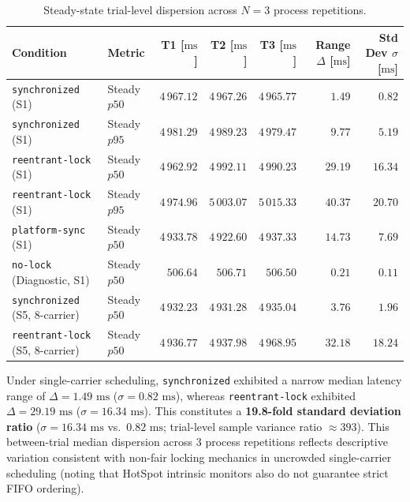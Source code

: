 \begin{table}[htbp]
  \centering
  \small
  \setlength{\tabcolsep}{3.5pt}
  \caption{Steady-state trial-level dispersion across $N=3$ process repetitions.}
  \label{tab:aqs-dispersion}
  \begin{tabularx}{\textwidth}{@{}>{\raggedright\arraybackslash}X l r r r r r@{}}
    \toprule
    \textbf{Condition} & \textbf{Metric} & \shortstack{\textbf{T1}\\\textbf{[$\text{ms}$]}} & \shortstack{\textbf{T2}\\\textbf{[$\text{ms}$]}} & \shortstack{\textbf{T3}\\\textbf{[$\text{ms}$]}} & \shortstack{\textbf{Range}\\\textbf{$\Delta$ [$\text{ms}$]}} & \shortstack{\textbf{Std Dev}\\\textbf{$\sigma$ [$\text{ms}$]}} \\
    \midrule
    \texttt{synchronized} (S1) & Steady $p50$ & $4\,967.12$ & $4\,967.26$ & $4\,965.77$ & $\mathbf{1.49}$ & $\mathbf{0.82}$ \\
    \texttt{synchronized} (S1) & Steady $p95$ & $4\,981.29$ & $4\,989.23$ & $4\,979.47$ & $9.77$ & $5.19$ \\
    \midrule
    \texttt{reentrant-lock} (S1) & Steady $p50$ & $4\,962.92$ & $4\,992.11$ & $4\,990.23$ & $\mathbf{29.19}$ & $\mathbf{16.34}$ \\
    \texttt{reentrant-lock} (S1) & Steady $p95$ & $4\,974.96$ & $5\,003.07$ & $5\,015.33$ & $40.37$ & $20.70$ \\
    \midrule
    \texttt{platform-sync} (S1) & Steady $p50$ & $4\,933.78$ & $4\,922.60$ & $4\,937.33$ & $14.73$ & $7.69$ \\
    \texttt{no-lock} (Diagnostic, S1) & Steady $p50$ & $506.64$ & $506.71$ & $506.50$ & $0.21$ & $0.11$ \\
    \midrule
    \texttt{synchronized} (S5, 8-carrier) & Steady $p50$ & $4\,932.23$ & $4\,931.28$ & $4\,935.04$ & $3.76$ & $1.96$ \\
    \texttt{reentrant-lock} (S5, 8-carrier) & Steady $p50$ & $4\,936.77$ & $4\,937.98$ & $4\,968.95$ & $32.18$ & $18.24$ \\
    \bottomrule
  \end{tabularx}
\end{table}

Under single-carrier scheduling, \texttt{synchronized} exhibited a narrow median latency range of $\Delta = 1.49\text{ ms}$ ($\sigma = 0.82\text{ ms}$), whereas \texttt{reentrant-lock} exhibited $\Delta = 29.19\text{ ms}$ ($\sigma = 16.34\text{ ms}$). This constitutes a \textbf{19.8-fold standard deviation ratio} ($\sigma = 16.34\text{ ms}$ vs.\ $0.82\text{ ms}$; trial-level sample variance ratio $\approx 393$). This between-trial median dispersion across 3 process repetitions reflects descriptive variation consistent with non-fair locking mechanics in uncrowded single-carrier scheduling (noting that HotSpot intrinsic monitors also do not guarantee strict FIFO ordering).

